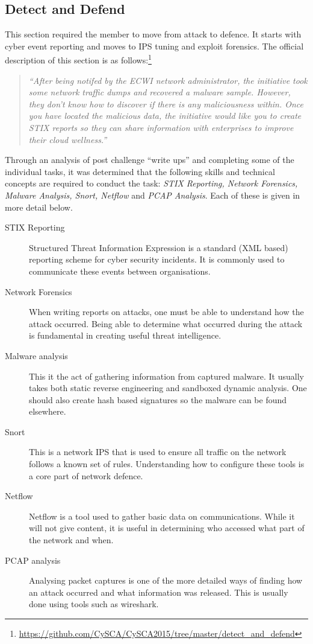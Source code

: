 \documentclass[a4paper,11pt]{report}
\begin{document}
		\subsection{Detect and Defend}
			This section required the member to move from attack to defence. 
			It starts with cyber event reporting and moves to IPS tuning and exploit forensics. 
			The official description of this section is as follows:\footnote{\url{https://github.com/CySCA/CySCA2015/tree/master/detect\_and\_defend}}
			\begin{quote}
				\textit{``After being notifed by the ECWI network administrator, 
				the initiative took some network traffic dumps and recovered a malware sample. 
				However, they don't know how to discover if there is any maliciousness within.
				Once you have located the malicious data, 
				the initiative would like you to create STIX reports so they can share information 
				with enterprises to improve their cloud wellness.''}
			\end{quote}
			
			Through an analysis of post challenge ``write ups'' and completing some of the individual tasks, 
			it was determined that the following skills and technical concepts are required to conduct the task: 
			\textit{STIX Reporting, Network Forensics, Malware Analysis, Snort, Netflow} and \textit{PCAP Analysis}.
			Each of these is given in more detail below. 
			\begin{description}
				\item[STIX Reporting]
					Structured Threat Information Expression is a standard (XML based) reporting scheme for cyber security incidents. 
					It is commonly used to communicate these events between organisations.
				\item[Network Forensics]
					When writing reports on attacks, one must be able to understand how the attack occurred. 
					Being able to determine what occurred during the attack is fundamental in creating useful threat intelligence. 
				\item[Malware analysis]
					This it the act of gathering information from captured malware. 
					It usually takes both static reverse engineering and sandboxed dynamic analysis. 
					One should also create hash based signatures so the malware can be found elsewhere. 
				\item[Snort]
					This is a network IPS that is used to ensure all traffic on the network follows a known set of rules. 
					Understanding how to configure these tools is a core part of network defence. 
				\item[Netflow]
					Netflow is a tool used to gather basic data on communications. 
					While it will not give content, it is useful in determining who accessed what part of the network and when. 
				\item[PCAP analysis] 
					Analysing packet captures is one of the more detailed ways of finding how an attack occurred and what information was released. 
					This is usually done using tools such as wireshark. 
			\end{description}
\end{document}
